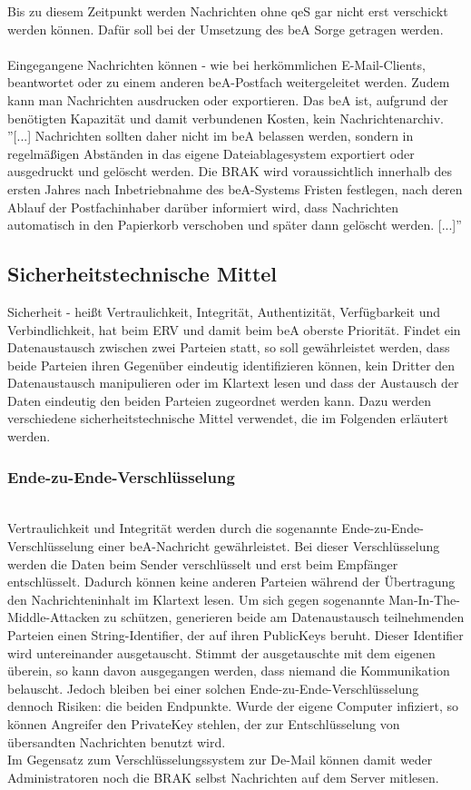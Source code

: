 Bis zu diesem Zeitpunkt werden Nachrichten ohne qeS gar nicht erst verschickt werden können. Dafür soll bei der Umsetzung des beA Sorge getragen werden. \\
\\
Eingegangene Nachrichten können - wie bei herkömmlichen E-Mail-Clients, beantwortet oder zu einem anderen beA-Postfach weitergeleitet werden. Zudem kann man Nachrichten ausdrucken oder exportieren. Das beA ist, aufgrund der benötigten Kapazität und damit verbundenen Kosten, kein Nachrichtenarchiv. ''[...] Nachrichten sollten daher nicht im beA belassen werden, sondern in regelmäßigen Abständen in das eigene Dateiablagesystem exportiert oder ausgedruckt und gelöscht werden. Die BRAK wird voraussichtlich innerhalb des ersten Jahres nach Inbetriebnahme des beA-Systems Fristen festlegen, nach deren Ablauf der Postfachinhaber darüber informiert wird, dass Nachrichten automatisch in den Papierkorb verschoben und später dann gelöscht werden. [...]'' \cite{bea:bea:brak3-2015}

\subsection{Sicherheitstechnische Mittel}
Sicherheit - heißt Vertraulichkeit, Integrität, Authentizität, Verfügbarkeit und Verbindlichkeit, hat beim ERV und damit beim beA oberste Priorität. Findet ein Datenaustausch zwischen zwei Parteien statt, so soll gewährleistet werden, dass beide Parteien ihren Gegenüber eindeutig identifizieren können, kein Dritter den Datenaustausch manipulieren oder im Klartext lesen und dass der Austausch der Daten eindeutig den beiden Parteien zugeordnet werden kann. Dazu werden verschiedene sicherheitstechnische Mittel verwendet, die im Folgenden erläutert werden.

\subsubsection{Ende-zu-Ende-Verschlüsselung}\hspace*{\fill} \\
Vertraulichkeit und Integrität werden durch die sogenannte Ende-zu-Ende-Verschlüsselung einer beA-Nachricht gewährleistet. Bei dieser Verschlüsselung werden die Daten beim Sender verschlüsselt und erst beim Empfänger entschlüsselt. Dadurch können keine anderen Parteien während der Übertragung den Nachrichteninhalt im Klartext lesen. Um sich gegen sogenannte Man-In-The-Middle-Attacken zu schützen, generieren beide am Datenaustausch teilnehmenden Parteien einen String-Identifier, der auf ihren PublicKeys beruht. Dieser Identifier wird untereinander ausgetauscht. Stimmt der ausgetauschte mit dem eigenen überein, so kann davon ausgegangen werden, dass niemand die Kommunikation belauscht. Jedoch bleiben bei einer solchen Ende-zu-Ende-Verschlüsselung dennoch Risiken: die beiden Endpunkte. Wurde der eigene Computer infiziert, so können Angreifer den PrivateKey stehlen, der zur Entschlüsselung von übersandten Nachrichten benutzt wird. \\
Im Gegensatz zum Verschlüsselungssystem zur De-Mail können damit weder Administratoren noch die BRAK selbst Nachrichten auf dem Server mitlesen.

